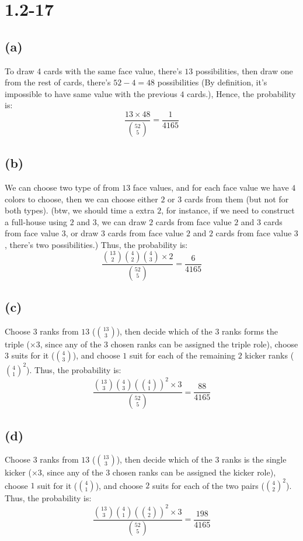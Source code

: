 \documentclass[12pt]{article}
\title{\mytitle}
\author{\textbf{\myauthor}}
\date{}
\begin{document}
\maketitle

\section*{1.2-17}
\subsection*{(a)}
To draw 4 cards with the same face value, there's $13$ possibilities, then draw one from the rest of cards, there's $52-4=48$ possibilities (By definition, it's impossible to have same value with the previous $4$ cards.), Hence, the probability is:
\[\frac{13\times 48}{\binom{52}{5}}=\frac{1}{4165}\]
\subsection*{(b)}
We can choose two type of from $13$ face values, and for each face value we have $4$ colors to choose, then we can choose either $2$ or $3$ cards from them (but not for both types). (btw, we should time a extra $2$, for instance, if we need to construct a full-house using $2$ and $3$, we can draw $2$ cards from face value $2$ and $3$ cards from face value $3$, or draw $3$ cards from face value $2$ and $2$ cards from face value $3$, there's two possibilities.) Thus, the probability is:
\[\frac{\binom{13}{2}\binom{4}{2}\binom{4}{3}\times 2}{\binom{52}{5}}=\frac{6}{4165}\]
\subsection*{(c)}
Choose $3$ ranks from $13$ ($\binom{13}{3}$), then decide which of the $3$ ranks forms the triple ($\times 3$, since any of the $3$ chosen ranks can be assigned the triple role), choose $3$ suits for it ($\binom{4}{3}$), and choose $1$ suit for each of the remaining $2$ kicker ranks ($\binom{4}{1}^2$). Thus, the probability is:
\[\frac{\binom{13}{3}\binom{4}{3}(\binom{4}{1})^2\times 3}{\binom{52}{5}}=\frac{88}{4165}\]
\subsection*{(d)}
Choose $3$ ranks from $13$ ($\binom{13}{3}$), then decide which of the $3$ ranks is the single kicker ($\times 3$, since any of the $3$ chosen ranks can be assigned the kicker role), choose $1$ suit for it ($\binom{4}{1}$), and choose $2$ suits for each of the two pairs ($\binom{4}{2}^2$). Thus, the probability is:
\[\frac{\binom{13}{3}\binom{4}{1}(\binom{4}{2})^2\times 3}{\binom{52}{5}}=\frac{198}{4165}\]
\end{document}
